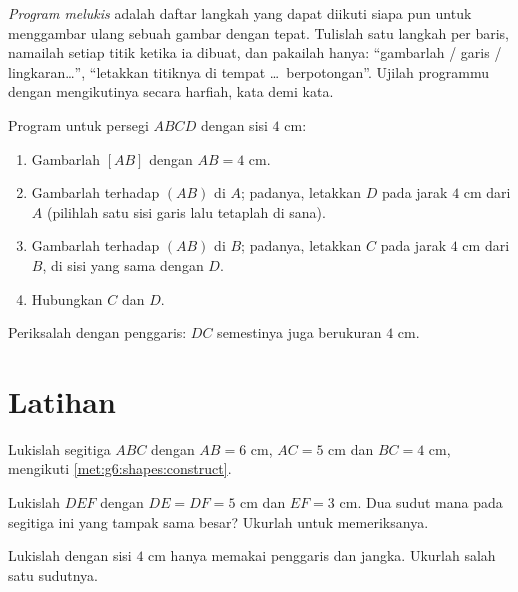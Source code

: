 \begin{method}\label{met:g6:shapes:program}
\emph{Program melukis} adalah daftar langkah yang dapat diikuti siapa
pun untuk menggambar ulang sebuah gambar dengan tepat. Tulislah satu
langkah per baris, namailah setiap titik ketika ia dibuat, dan
pakailah hanya: ``gambarlah  / garis / lingkaran\dots'',
``letakkan titiknya di tempat \dots\ berpotongan''. Ujilah programmu
dengan mengikutinya secara harfiah, kata demi kata.
\end{method}

\begin{example}\label{ex:g6:shapes:program}
Program untuk persegi $ABCD$ dengan sisi $4$ cm:
\begin{enumerate}
  \item Gambarlah  $[AB]$ dengan $AB = 4$ cm.
  \item Gambarlah  terhadap $(AB)$ di $A$; padanya,
        letakkan $D$ pada jarak $4$ cm dari $A$ (pilihlah satu sisi
        garis lalu tetaplah di sana).
  \item Gambarlah  terhadap $(AB)$ di $B$; padanya,
        letakkan $C$ pada jarak $4$ cm dari $B$, di sisi yang sama
        dengan $D$.
  \item Hubungkan $C$ dan $D$.
\end{enumerate}
Periksalah dengan penggaris: $DC$ semestinya juga berukuran $4$ cm.
\end{example}

\section{Latihan}

\begin{exercise}[$\star$]\label{exo:g6:shapes:1}
Lukislah segitiga $ABC$ dengan $AB = 6$ cm, $AC = 5$ cm dan
$BC = 4$ cm, mengikuti \cref{met:g6:shapes:construct}.
\end{exercise}

\begin{exercise}[$\star$]\label{exo:g6:shapes:2}
Lukislah  $DEF$ dengan $DE = DF = 5$ cm dan
$EF = 3$ cm. Dua sudut mana pada segitiga ini yang tampak sama besar?
Ukurlah untuk memeriksanya.
\end{exercise}

\begin{exercise}[$\star$]\label{exo:g6:shapes:3}
Lukislah  dengan sisi $4$ cm hanya memakai
penggaris dan jangka. Ukurlah salah satu sudutnya.
\end{exercise}

